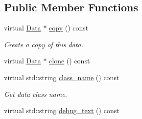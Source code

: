 \subsection*{Public Member Functions}
\begin{DoxyCompactItemize}
\item 
virtual \hyperlink{classcreek_1_1_data}{Data} $\ast$ \hyperlink{classcreek_1_1_data_a459f18eac5c77f167674d6b9aedb0a2d}{copy} () const \hypertarget{classcreek_1_1_data_a459f18eac5c77f167674d6b9aedb0a2d}{}\label{classcreek_1_1_data_a459f18eac5c77f167674d6b9aedb0a2d}

\begin{DoxyCompactList}\small\item\em Create a copy of this data. \end{DoxyCompactList}\item 
virtual \hyperlink{classcreek_1_1_data}{Data} $\ast$ \hyperlink{classcreek_1_1_data_a2d2c1d911835d30e7372e12f9a5b2820}{clone} () const 
\item 
virtual std\+::string \hyperlink{classcreek_1_1_data_a3d689a66e3efebd58539b601c90f5f5d}{class\+\_\+name} () const \hypertarget{classcreek_1_1_data_a3d689a66e3efebd58539b601c90f5f5d}{}\label{classcreek_1_1_data_a3d689a66e3efebd58539b601c90f5f5d}

\begin{DoxyCompactList}\small\item\em Get data class name. \end{DoxyCompactList}\item 
virtual std\+::string \hyperlink{classcreek_1_1_data_a32fa079c6f972eae802a5ac5b83d8a07}{debug\+\_\+text} () const 
\end{DoxyCompactItemize}
